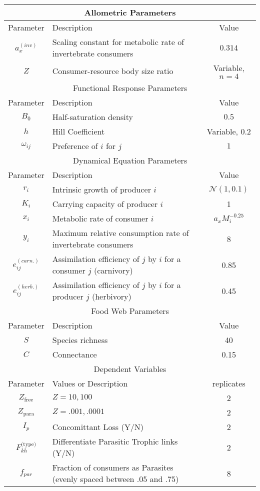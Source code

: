 \documentclass[11pt]{amsart}
\begin{document}
\begin{tabularx}{\textwidth}{|c|X|c|}
\hline
\multicolumn{3}{|c|}{Allometric Parameters}\\
\hline
Parameter&Description&Value\\
\hline
$a_x^{(inv)}$&Scaling constant for metabolic rate of invertebrate consumers & $0.314$\\
$Z$&Consumer-resource body size ratio&Variable, $n=4$\\
\hline
\hline
\multicolumn{3}{|c|}{Functional Response Parameters}\\
\hline
Parameter&Description&Value\\
\hline
$B_0$&Half-saturation density&$0.5$\\
$h$&Hill Coefficient&Variable, $0.2$\\
$\omega_{ij}$&Preference of $i$ for $j$&$1$\\
\hline
\hline
\multicolumn{3}{|c|}{Dynamical Equation Parameters}\\
\hline
Parameter&Description&Value\\
\hline
$r_i$&Intrinsic growth of producer $i$&$\mathcal{N}(1,0.1)$\\
$K_i$&Carrying capacity of producer $i$&1\\
$x_i$&Metabolic rate of consumer $i$&$a_x M_i^{-0.25}$\\
$y_i$&Maximum relative consumption rate of invertebrate consumers & 8\\
$e_{ij}^{(carn.)}$&Assimilation efficiency of $j$ by $i$ for a consumer $j$ (carnivory) & 0.85\\
$e_{ij}^{(herb.)}$&Assimilation efficiency of $j$ by $i$ for a producer $j$ (herbivory) & 0.45\\
\hline
\hline
\multicolumn{3}{|c|}{Food Web Parameters}\\
\hline
Parameter&Description&Value\\
\hline
$S$&Species richness&40\\
$C$&Connectance & 0.15\\
\hline
\hline
\multicolumn{3}{|c|}{Dependent Variables}\\
\hline
Parameter & Values or Description & replicates\\
$Z_\text{free}$&$Z=10,100$&2\\
$Z_\text{para}$&$Z=.001,.0001$&2\\
$I_p$&Concomittant Loss (Y/N)&2\\
$F_{kh}^\text{(type)}$&Differentiate Parasitic Trophic links (Y/N)&2\\
$f_{par}$&Fraction of consumers as Parasites (evenly spaced between .05 and .75)&8\\
\hline
\end{tabularx}
\end{document}

